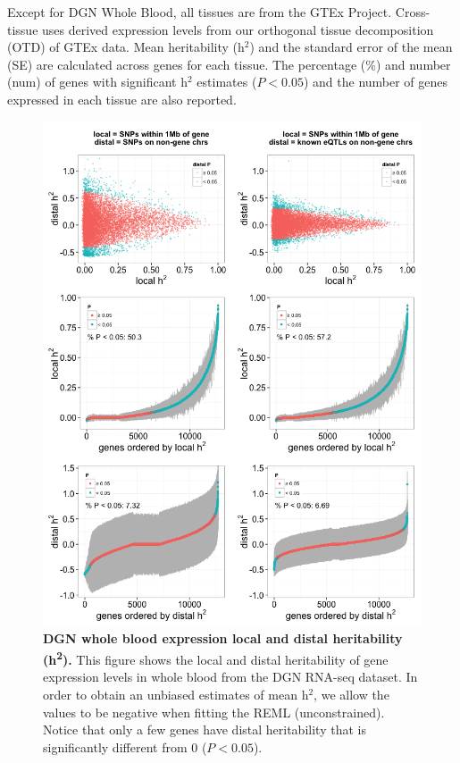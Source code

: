 \documentclass[10pt,letterpaper]{article}
\begin{document}
\begin{table}[!ht]
\begin{adjustwidth}{-2.25in}{0in}
\begin{tabular}{lrrrrr}
   \hline
\end{tabular}
\begin{flushleft} Except for DGN Whole Blood, all tissues are from the GTEx Project. Cross-tissue uses derived expression levels from our orthogonal tissue decomposition (OTD) of GTEx data. Mean heritability (h$^2$) and the standard error of the mean (SE) are calculated across genes for each tissue. The percentage (\%) and number (num) of genes with significant h$^2$ estimates ($P<0.05$) and the number of genes expressed in each tissue are also reported. 
\end{flushleft}
\label{table-h2}
\end{adjustwidth}
\end{table}

\clearpage

\begin{figure}[H]
\includegraphics[width=12cm]{Figures/Fig-DGN-jt-h2-UNCONSTRAINED.png}
\caption{{\bf DGN whole blood expression local and distal heritability
(h\textsuperscript{2}).} 
%
This figure shows the local and distal heritability of gene expression levels in whole blood from the DGN RNA-seq dataset. In order to obtain an unbiased estimates of mean h$^2$, we allow the values to be negative when fitting the REML (unconstrained). Notice that only a few genes have distal heritability that is significantly different from 0 ($P<0.05$). 
}
\end{figure}
\end{document}
